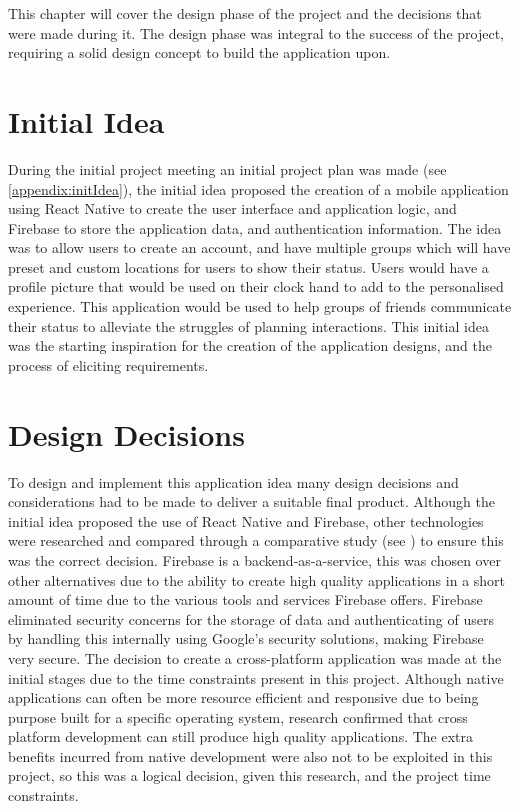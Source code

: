 This chapter will cover the design phase of the project and the decisions that were made during it. The design phase was integral to the success of the project, requiring a solid design concept to build the application upon.

\section{Initial Idea}
During the initial project meeting an initial project plan was made (see \ref{appendix:initIdea}), the initial idea proposed the creation of a mobile application using React Native \cite{reactnative} to create the user interface and application logic, and Firebase \cite{firebase} to store the application data, and authentication information. The idea was to allow users to create an account, and have multiple groups which will have preset and custom locations for users to show their status. Users would have a profile picture that would be used on their clock hand to add to the personalised experience. This application would be used to help groups of friends communicate their status to alleviate the struggles of planning interactions. This initial idea was the starting inspiration for the creation of the application designs, and the process of eliciting requirements.

\section{Design Decisions}\label{designDecis}
To design and implement this application idea many design decisions and considerations had to be made to deliver a suitable final product. Although the initial idea proposed the use of React Native and Firebase, other technologies were researched and compared through a comparative study (see \cite{compStudy}) to ensure this was the correct decision. Firebase is a backend-as-a-service, this was chosen over other alternatives due to the ability to create high quality applications in a short amount of time due to the various tools and services Firebase offers. Firebase eliminated security concerns for the storage of data and authenticating of users by handling this internally using Google's security solutions, making Firebase very secure. The decision to create a cross-platform application was made at the initial stages due to the time constraints present in this project. Although native applications can often be more resource efficient and responsive due to being purpose built for a specific operating system, research confirmed that cross platform development can still produce high quality applications. The extra benefits incurred from native development were also not to be exploited in this project, so this was a logical decision, given this research, and the project time constraints.

